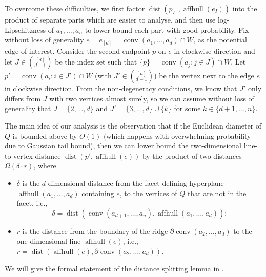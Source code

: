 \documentclass{theoretics}
\newcommand{\aff}{\operatorname{affhull}}
\newcommand{\conv}{\operatorname{conv}}
\newcommand{\dist}{\operatorname{dist}}
\begin{document}
To overcome these difficulties, we first factor $\dist(p_{I^+}, \aff(e_I))$ into the product
of separate parts which are easier to analyse, and then use log-Lipschitzness of $a_1, \ldots, a_n$ to lower-bound each part with good probability.
Fix without loss of generality $e = e_{[d]} = \conv(a_1, \ldots, a_d) \cap W$, as the potential edge of interest. 
Consider the second endpoint $p$ on $e$ in
clockwise direction and let $J \in \binom{[d]}{d-1}$ be the index set
such that $\{p\} = \conv(a_j : j \in J) \cap W$.
Let $p' = \conv(a_i : i \in J') \cap
W$ (with $J' \in \binom{[n]}{d-1}$) be the vertex next to the edge $e$ in clockwise direction.
From the non-degeneracy conditions, we know that $J'$ only differs from $J$ with
two vertices almost surely, so we can assume without loss of generality that $J
= \{2, \ldots, {d}\}$ and $J' = \{3, \ldots, d\} \cup \{k\}$ for some
$k \in \{d+1, \ldots, n\}$.

The main idea of our analysis is the observation that if the Euclidean diameter of $Q$ is
bounded above by $O(1)$ (which happens with overwhelming probability due to
Gaussian tail bound), then we can lower bound the two-dimensional line-to-vertex
distance $\dist(p', \aff(e))$ by the product of two distances $\Omega(\delta \cdot r)$, where
\begin{itemize}
    \item $\delta$ is the $d$-dimensional distance from the facet-defining hyperplane $\aff(a_1, \ldots, a_d)$ containing $e$, to the vertices of $Q$ that are not in the facet, i.e., 
    $$\delta = \dist(\conv(a_{d+1}, \ldots, a_n), \aff(a_1, \ldots, a_d));$$
    \item $r$ is the distance from the boundary of the ridge $\partial \conv(a_2, \ldots, a_d)$ to the one-dimensional line $\aff(e)$, i.e., $r = \dist(\aff(e), \partial \conv(a_2, \ldots, a_d))$.
\end{itemize}
We will give the formal statement of the distance splitting lemma in .

\end{document}
